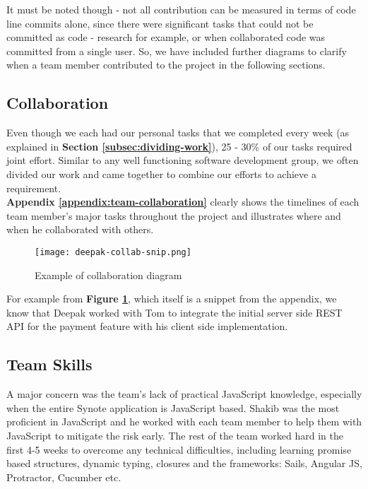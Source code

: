 It must be noted though - not all contribution can be measured in terms of code line commits alone, since there were significant tasks that could not be committed as code - research for example, or when collaborated code was committed from a single user. So, we have included further diagrams to clarify when a team member contributed to the project in the following sections.

\subsection{Collaboration}
\label{subsec:collaboration}

Even though we each had our personal tasks that we completed every week (as explained in \textbf{Section \ref{subsec:dividing-work}}), 25 - 30\% of our tasks  required joint effort. Similar to any well functioning software development group, we often divided our work and came together to combine our efforts to achieve a requirement.\\

\textbf{Appendix \ref{appendix:team-collaboration}} clearly shows the timelines of each team member's major tasks throughout the project and illustrates where and when he collaborated with others.\\

\begin{figure}[!hbt]
  	\centering
 	\texttt{[image: deepak-collab-snip.png]}
  	\caption{Example of collaboration diagram}
 	\label{fig:deepak-collaboration-snippet}
\end{figure}

For example from \textbf{Figure \ref{fig:deepak-collaboration-snippet}}, which itself is a snippet from the appendix, we know that Deepak worked with Tom to integrate the initial server side REST API for the payment feature with his client side implementation.

\subsection{Team Skills}
\label{subsec:team-skills}

A major concern was the team's lack of practical JavaScript knowledge, especially when the entire Synote application is JavaScript based. Shakib was the most proficient in JavaScript and he worked with each team member to help them with JavaScript to mitigate the risk early. The rest of the team worked hard in the first 4-5 weeks to overcome any technical difficulties, including learning promise based structures, dynamic typing, closures and the frameworks: Sails, Angular JS, Protractor, Cucumber etc.\\

